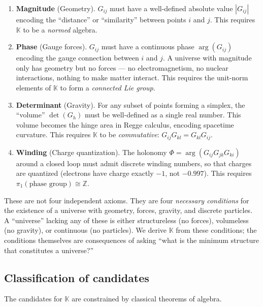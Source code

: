 \begin{enumerate}[label=\textbf{R\arabic*.}, leftmargin=2cm]
\item \textbf{Magnitude} (Geometry). $G_{ij}$ must have a well-defined absolute value $|G_{ij}|$ encoding the ``distance'' or ``similarity'' between points $i$ and $j$. This requires $\mathbb{K}$ to be a \emph{normed} algebra.

\item \textbf{Phase} (Gauge forces). $G_{ij}$ must have a continuous phase $\arg(G_{ij})$ encoding the gauge connection between $i$ and $j$. A universe with magnitude only has geometry but no forces --- no electromagnetism, no nuclear interactions, nothing to make matter interact. This requires the unit-norm elements of $\mathbb{K}$ to form a \emph{connected Lie group}.

\item \textbf{Determinant} (Gravity). For any subset of points forming a simplex, the ``volume'' $\det(G_h)$ must be well-defined as a single real number. This volume becomes the hinge area in Regge calculus, encoding spacetime curvature. This requires $\mathbb{K}$ to be \emph{commutative}: $G_{ij} G_{kl} = G_{kl} G_{ij}$.

\item \textbf{Winding} (Charge quantization). The holonomy $\Phi = \arg(G_{ij} G_{jk} G_{ki})$ around a closed loop must admit discrete winding numbers, so that charges are quantized (electrons have charge exactly $-1$, not $-0.997$). This requires $\pi_1(\text{phase group}) \cong \mathbb{Z}$.
\end{enumerate}

\begin{remark}
These are not four independent axioms. They are four \emph{necessary conditions} for the existence of a universe with geometry, forces, gravity, and discrete particles. A ``universe'' lacking any of these is either structureless (no forces), volumeless (no gravity), or continuous (no particles). We derive $\mathbb{K}$ from these conditions; the conditions themselves are consequences of asking ``what is the minimum structure that constitutes a universe?''
\end{remark}

\subsection{Classification of candidates}

The candidates for $\mathbb{K}$ are constrained by classical theorems of algebra.

